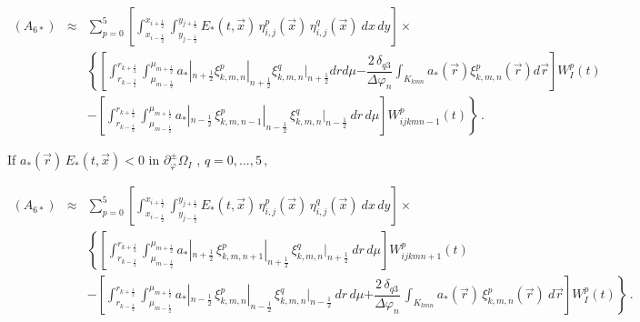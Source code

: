 \documentclass[11pt]{article}
\newcommand{\ot}{\frac{1}{2}}
\begin{document}
%
{\small
\begin{eqnarray*}
(A_{6*}) %
&
\approx
&
\sum_{p=0}^{5} 
\left[ %
\int_{x_{i - \ot}}^{x_{i + \ot}} 
\int_{y_{j - \ot}}^{y_{j + \ot}} 
E_{*}(t,\vec{x}) \, \eta^{p}_{i,j}(\vec{x}) \, \eta^{q}_{i,j}(\vec{x}) \:dx \, dy %
\right] \times 
\\
& &
\left\lbrace 
\left[ %
\int_{r_{k - \ot}}^{r_{k + \ot}}
\int_{\mu_{m - \ot}}^{\mu_{m + \ot}}
a_{*}|_{n + \ot} \xi^{p}_{k,m,n}|_{n + \ot}  
\xi^{q}_{k,m,n}|_{n + \ot} dr d\mu 
%
\right. \right. 
\left. 
\left.
- \dfrac{2 \, \delta_{q3}}{\Delta \varphi_{n}} \int_{K_{kmn}}
a_{*}(\vec{r}) \xi^{p}_{k,m,n}(\vec{r}) d\vec{r} %
\right] \right. 
W_{I}^p (t)
\\
& & \left. 
- \left[ %
\int_{r_{k - \ot}}^{r_{k + \ot}} 
\int_{\mu_{m - \ot}}^{\mu_{m + \ot}} 
a_{*}|_{n - \ot} \, \xi^{p}_{k,m,n-1}|_{n - \ot} \, 
\xi^{q}_{k,m,n}|_{n - \ot} \: dr \, d\mu %
\right] 
 W_{ijkmn-1  }^p(t) \right\rbrace \, .
\end{eqnarray*}
}
%
%
%

If $a_{*}(\vec{r}) \, E_{*}(t,\vec{x}) < 0$ in $\partial_{\varphi}^{\pm} \Omega_{I}$ 
, $q = 0, ...,5 \, ,$

%
{\small
\begin{eqnarray*}
(A_{6*}) 
&
\approx
&
%
\sum_{p=0}^{5} 
\left[ 
\int_{x_{i - \ot}}^{x_{i + \ot}} 
\int_{y_{j - \ot}}^{y_{j + \ot}} 
E_{*}(t,\vec{x}) \, \eta^{p}_{i,j}(\vec{x}) \, \eta^{q}_{i,j}(\vec{x}) \:dx \, dy 
\right] 
\times 
\\
& & %
\left\lbrace 
\left[ %
\int_{r_{k - \ot}}^{r_{k + \ot}}
\int_{\mu_{m - \ot}}^{\mu_{m + \ot}} 
a_{*}|_{n + \ot} \, \xi^{p}_{k,m,n+1}|_{n + \ot} \, 
\xi^{q}_{k,m,n}|_{n + \ot} \: dr \, d\mu %
\right]
W_{ijkmn+1 }^p(t)
\right.
\\
& & %
 - \left[ %
\int_{r_{k - \ot}}^{r_{k + \ot}} 
\int_{\mu_{m - \ot}}^{\mu_{m + \ot}} 
a_{*}|_{n - \ot} \, \xi^{p}_{k,m,n}|_{n - \ot} \, 
\xi^{q}_{k,m,n}|_{n - \ot} \: dr \, d\mu %
\right. 
\left. \left. %
+
\dfrac{2 \, \delta_{q3}}{\Delta \varphi_{n}} \,  \int_{K_{kmn}}
a_{*}(\vec{r}) \,  \xi^{p}_{k,m,n}(\vec{r}) \: d\vec{r}  %
\right] 
W_{I}^p (t)
\right\rbrace \, .
\end{eqnarray*}
}%
%
%
%
%
%
%
%
%
%
%
%
%
%
%
\end{document}
